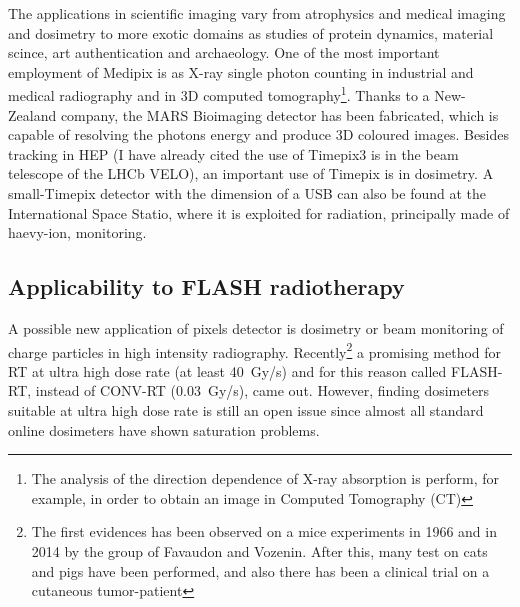     The applications in scientific imaging vary from atrophysics and medical imaging and dosimetry to more exotic domains as studies of protein dynamics, material scince, art authentication and archaeology.
    One of the most important employment of Medipix is as X-ray single photon counting in industrial and medical radiography and in 3D computed tomography\footnote{The analysis of the direction dependence of X-ray absorption is perform, for example, in order to obtain an image in Computed Tomography (CT)}. Thanks to a New-Zealand company, the MARS Bioimaging detector has been fabricated, which is capable of resolving the photons energy and produce 3D coloured images.
    Besides tracking in HEP (I have already cited the use of Timepix3 is in the beam telescope of the LHCb VELO), an important use of Timepix is in dosimetry.
    A small-Timepix detector with the dimension of a USB can also be found at the International Space Statio, where it is exploited for radiation, principally made of haevy-ion, monitoring. 
 
    \subsection{Applicability to FLASH radiotherapy}
        A possible new application of pixels detector is dosimetry or beam monitoring of charge particles in high intensity radiography.
        Recently\footnote{The first evidences has been observed on a mice experiments in 1966 and in 2014 by the group of Favaudon and Vozenin. After this, many test on cats and pigs have been performed, and also there has been a clinical trial on a cutaneous tumor-patient} a promising method for RT at ultra high dose rate (at least \SI{40}{Gy/s}) and for this reason called FLASH-RT\cite{FLASH_review}, instead of CONV-RT (\SI{0.03}{Gy/s}), came out. However, finding dosimeters suitable at ultra high dose rate is still an open issue since almost all standard online dosimeters have shown saturation problems.

